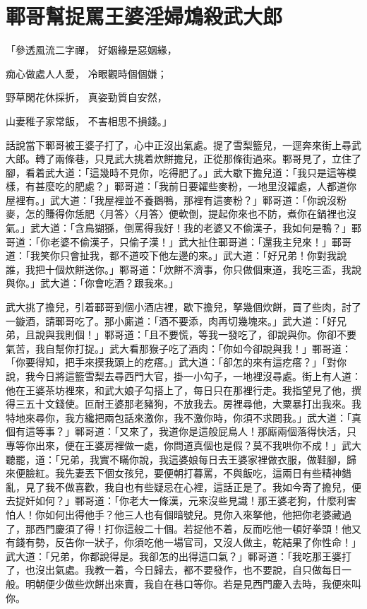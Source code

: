 %

\chapter{鄆哥幫捉罵王婆\KG 淫婦鴆殺武大郎}

\begin{showcontents}{}



「參透風流二字禪，  好姻緣是惡姻緣，

痴心做處人人愛，  冷眼觀時個個嫌；

野草閑花休採折，  真姿勁質自安然，

山妻稚子家常飯，  不害相思不損錢。」

話說當下鄆哥被王婆子打了，心中正沒出氣處。提了雪梨籃兒，一逕奔來街上尋武大郎。轉了兩條巷，只見武大挑着炊餅擔兒，正從那條街過來。鄆哥見了，立住了腳，看着武大道：「這幾時不見你，吃得肥了。」武大歇下擔兒道：「我只是這等模樣，有甚麼吃的肥處？」鄆哥道：「我前日要糴些麥粉，一地里沒糴處，人都道你屋裡有。」武大道：「我屋裡並不養鵝鴨，那裡有這麥粉？」鄆哥道：「你說沒粉麥，怎的賺得你恁肥〈月答〉〈月答〉便軟倒，提起你來也不防，煮你在鍋裡也沒氣。」武大道：「含鳥猢猻，倒罵得我好！我的老婆又不偷漢子，我如何是鴨？」鄆哥道：「你老婆不偷漢子，只偷子漢！」武大扯住鄆哥道：「還我主兒來！」鄆哥道：「我笑你只會扯我，都不道咬下他左邊的來。」武大道：「好兄弟！你對我說誰，我把十個炊餅送你。」鄆哥道：「炊餅不濟事，你只做個東道，我吃三盃，我說與你。」武大道：「你會吃酒？跟我來。」

武大挑了擔兒，引着鄆哥到個小酒店裡，歇下擔兒，拏幾個炊餅，買了些肉，討了一鏇酒，請鄆哥吃了。那小廝道：「酒不要添，肉再切幾塊來。」武大道：「好兄弟，且說與我則個！」鄆哥道：「且不要慌，等我一發吃了，卻說與你。你卻不要氣苦，我自幫你打捉。」武大看那猴子吃了酒肉：「你如今卻說與我！」鄆哥道：「你要得知，把手來摸我頭上的疙瘩。」武大道：「卻怎的來有這疙瘩？」「對你說，我今日將這籃雪梨去尋西門大官，掛一小勾子，一地裡沒尋處。街上有人道：他在王婆茶坊裡來，和武大娘子勾搭上了，每日只在那裡行走。我指望見了他，撰得三五十文錢使。叵耐王婆那老豬狗，不放我去。房裡尋他，大粟暴打出我來。我特地來尋你，我方纔把兩包話來激你，我不激你時，你須不求問我。」武大道：「真個有這等事？」鄆哥道：「又來了，我道你是這般屁鳥人！那廝兩個落得快活，只專等你出來，便在王婆房裡做一處，你問道真個也是假？莫不我哄你不成！」武大聽罷，道：「兄弟，我實不瞞你說，我這婆娘每日去王婆家裡做衣服，做鞋腳，歸來便臉紅。我先妻丟下個女孩兒，要便朝打暮罵，不與飯吃，這兩日有些精神錯亂，見了我不做喜歡，我自也有些疑忌在心裡，這話正是了。我如今寄了擔兒，便去捉奸如何？」鄆哥道：「你老大一條漢，元來沒些見識！那王婆老狗，什麼利害怕人！你如何出得他手？他三人也有個暗號兒。見你入來拏他，他把你老婆藏過了，那西門慶須了得！打你這般二十個。若捉他不着，反而吃他一頓好拳頭！他又有錢有勢，反告你一狀子，你須吃他一場官司，又沒人做主，乾結果了你性命！」武大道：「兄弟，你都說得是。我卻怎的出得這口氣？」鄆哥道：「我吃那王婆打了，也沒出氣處。我教一着，今日歸去，都不要發作，也不要說，自只做每日一般。明朝便少做些炊餅出來賣，我自在巷口等你。若是見西門慶入去時，我便來叫你。


\end{showcontents}
